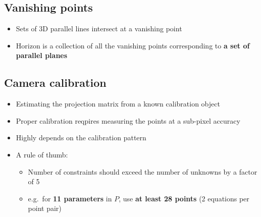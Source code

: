 \documentclass{article}
\begin{document}
    \subsection{Vanishing points}
    \begin{itemize}
        \item Sets of 3D parallel lines intersect at a vanishing point
        \item Horizon is a collection of all the vanishing points corresponding to \textbf{a set of parallel planes}
    \end{itemize}

    \subsection{Camera calibration}
    \begin{itemize}
        \item Estimating the projection matrix from a known calibration object
        \item Proper calibration reqpires measuring the points at a sub-pixel accuracy
        \item Highly depends on the calibration pattern
        \item A rule of thumb:
        \begin{itemize}
            \item Number of constraints should exceed the number of unknowns by a factor of 5
            \item e.g.\ for \textbf{11 parameters} in $P$, use \textbf{at least 28 points} (2 equations per point pair)
        \end{itemize}
    \end{itemize}

    \newpage
\end{document}
